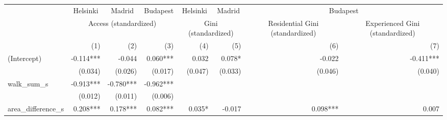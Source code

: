 \begin{tabular}{lrrrrrrr}
\toprule
                         & \multicolumn{1}{c}{Helsinki} & \multicolumn{1}{c}{Madrid} & \multicolumn{1}{c}{Budapest} & \multicolumn{1}{c}{Helsinki} & \multicolumn{1}{c}{Madrid} &                                        \multicolumn{2}{c}{Budapest}                                       \\ 
\cmidrule(lr){2-2} \cmidrule(lr){3-3} \cmidrule(lr){4-4} \cmidrule(lr){5-5} \cmidrule(lr){6-6} \cmidrule(lr){7-8} 
                         &                         \multicolumn{3}{c}{Access (standardized)}                        &          \multicolumn{2}{c}{Gini (standardized)}          & \multicolumn{1}{c}{Residential Gini (standardized)} & \multicolumn{1}{c}{Experienced Gini (standardized)} \\ 
\cmidrule(lr){2-4} \cmidrule(lr){5-6} \cmidrule(lr){7-7} \cmidrule(lr){8-8} 
                         &                          (1) &                        (2) &                          (3) &                          (4) &                        (5) &                                                 (6) &                                                 (7) \\ 
\midrule
(Intercept)              &                    -0.114*** &                     -0.044 &                     0.060*** &                        0.032 &                     0.078* &                                              -0.022 &                                           -0.411*** \\ 
                         &                      (0.034) &                    (0.026) &                      (0.017) &                      (0.047) &                    (0.033) &                                             (0.046) &                                             (0.040) \\ 
walk\_sum\_s             &                    -0.913*** &                  -0.780*** &                    -0.962*** &                              &                            &                                                     &                                                     \\ 
                         &                      (0.012) &                    (0.011) &                      (0.006) &                              &                            &                                                     &                                                     \\ 
area\_difference\_s      &                     0.208*** &                   0.178*** &                     0.082*** &                       0.035* &                     -0.017 &                                            0.098*** &                                               0.007 \\ 

\end{tabular}
